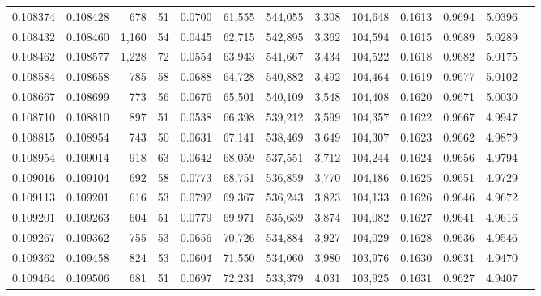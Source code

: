 \begin{tabular}{rrrrrrrrrrrrr}
0.108374 & 0.108428 &   678 &  51 &                                     0.0700 &  61,555 & 544,055 &   3,308 & 104,648 & 0.1613 & 0.9694 & 5.0396 \\
0.108432 & 0.108460 & 1,160 &  54 &                                     0.0445 &  62,715 & 542,895 &   3,362 & 104,594 & 0.1615 & 0.9689 & 5.0289 \\
0.108462 & 0.108577 & 1,228 &  72 &                                     0.0554 &  63,943 & 541,667 &   3,434 & 104,522 & 0.1618 & 0.9682 & 5.0175 \\
0.108584 & 0.108658 &   785 &  58 &                                     0.0688 &  64,728 & 540,882 &   3,492 & 104,464 & 0.1619 & 0.9677 & 5.0102 \\
0.108667 & 0.108699 &   773 &  56 &                                     0.0676 &  65,501 & 540,109 &   3,548 & 104,408 & 0.1620 & 0.9671 & 5.0030 \\
0.108710 & 0.108810 &   897 &  51 &                                     0.0538 &  66,398 & 539,212 &   3,599 & 104,357 & 0.1622 & 0.9667 & 4.9947 \\
0.108815 & 0.108954 &   743 &  50 &                                     0.0631 &  67,141 & 538,469 &   3,649 & 104,307 & 0.1623 & 0.9662 & 4.9879 \\
0.108954 & 0.109014 &   918 &  63 &                                     0.0642 &  68,059 & 537,551 &   3,712 & 104,244 & 0.1624 & 0.9656 & 4.9794 \\
0.109016 & 0.109104 &   692 &  58 &                                     0.0773 &  68,751 & 536,859 &   3,770 & 104,186 & 0.1625 & 0.9651 & 4.9729 \\
0.109113 & 0.109201 &   616 &  53 &                                     0.0792 &  69,367 & 536,243 &   3,823 & 104,133 & 0.1626 & 0.9646 & 4.9672 \\
0.109201 & 0.109263 &   604 &  51 &                                     0.0779 &  69,971 & 535,639 &   3,874 & 104,082 & 0.1627 & 0.9641 & 4.9616 \\
0.109267 & 0.109362 &   755 &  53 &                                     0.0656 &  70,726 & 534,884 &   3,927 & 104,029 & 0.1628 & 0.9636 & 4.9546 \\
0.109362 & 0.109458 &   824 &  53 &                                     0.0604 &  71,550 & 534,060 &   3,980 & 103,976 & 0.1630 & 0.9631 & 4.9470 \\
0.109464 & 0.109506 &   681 &  51 &                                     0.0697 &  72,231 & 533,379 &   4,031 & 103,925 & 0.1631 & 0.9627 & 4.9407 \\

\end{tabular}
